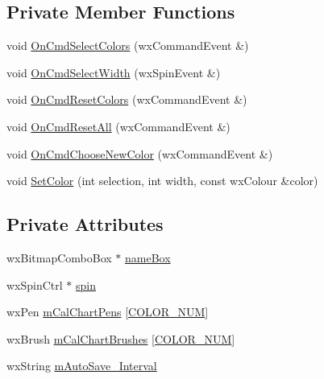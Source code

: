 \subsection*{Private Member Functions}
\begin{DoxyCompactItemize}
\item 
void \hyperlink{a00105_a12990efbdd9d1bfebd89d2a7190ef3cd}{On\-Cmd\-Select\-Colors} (wx\-Command\-Event \&)
\item 
void \hyperlink{a00105_a64eb31d46d0870cd3acf47db2f72ba18}{On\-Cmd\-Select\-Width} (wx\-Spin\-Event \&)
\item 
void \hyperlink{a00105_a6b5ec6ceda04d10ea25aedd5ad207683}{On\-Cmd\-Reset\-Colors} (wx\-Command\-Event \&)
\item 
void \hyperlink{a00105_aa1853c2c6f42724af74872eeff9a0d3e}{On\-Cmd\-Reset\-All} (wx\-Command\-Event \&)
\item 
void \hyperlink{a00105_a0d6d5cd97403e3e189690756f42f628b}{On\-Cmd\-Choose\-New\-Color} (wx\-Command\-Event \&)
\item 
void \hyperlink{a00105_ace328dfcada372573e55d0901a2c09c5}{Set\-Color} (int selection, int width, const wx\-Colour \&color)
\end{DoxyCompactItemize}
\subsection*{Private Attributes}
\begin{DoxyCompactItemize}
\item 
wx\-Bitmap\-Combo\-Box $\ast$ \hyperlink{a00105_a78195e464e8e9689fc52d7856d67e858}{name\-Box}
\item 
wx\-Spin\-Ctrl $\ast$ \hyperlink{a00105_ab8efae9ee6c39a6a518747ed40c224b2}{spin}
\item 
wx\-Pen \hyperlink{a00105_ac71edc75170a021de5e3d1c81bd83aa8}{m\-Cal\-Chart\-Pens} \mbox{[}\hyperlink{a00191_a09f513be9cbd80355eda10ee8e4059e2a1ad5b60f3b4357df62b270dc435e151d}{C\-O\-L\-O\-R\-\_\-\-N\-U\-M}\mbox{]}
\item 
wx\-Brush \hyperlink{a00105_a4e47359e0576e1b1057682688cc5d8b4}{m\-Cal\-Chart\-Brushes} \mbox{[}\hyperlink{a00191_a09f513be9cbd80355eda10ee8e4059e2a1ad5b60f3b4357df62b270dc435e151d}{C\-O\-L\-O\-R\-\_\-\-N\-U\-M}\mbox{]}
\item 
wx\-String \hyperlink{a00105_a05805c20323d9e6259420b229cf1970a}{m\-Auto\-Save\-\_\-\-Interval}
\end{DoxyCompactItemize}


